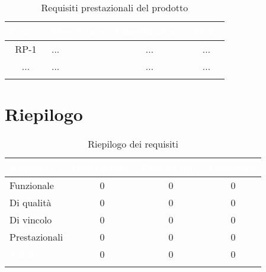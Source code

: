 \begingroup
\setlength{\tabcolsep}{10pt}
\renewcommand{\arraystretch}{1.5}
\begin{xltabular}{\textwidth}{| c | X | c | c |}
    \hline
     \textbf{\textcolor{white}{Codice}} & \textbf{\textcolor{white}{Descrizione}} & \textbf{\textcolor{white}{Classificazione}} & \textbf{\textcolor{white}{Fonte}}\\
    \hline
    \endhead
    RP-1 & ... & ... & ... \\
    \hline
    ... & ... & ... & ... \\
    \hline
     \caption{Requisiti prestazionali del prodotto}
    \label{tab:reqpre}
\end{xltabular}
\endgroup

\section{Riepilogo}
\begingroup
\setlength{\tabcolsep}{10pt}
\renewcommand{\arraystretch}{1.5}
\begin{xltabular}{\textwidth}{| X | c | c | c |}
    \hline
     \textbf{\textcolor{white}{Requisito}} & \textbf{\textcolor{white}{Obbligatorio}} & \textbf{\textcolor{white}{Desiderabile}} & \textbf{\textcolor{white}{Opzionale}}\\
    \hline
    \endhead
    Funzionale & 0 & 0 & 0 \\
    \hline
    Di qualità & 0 & 0 & 0 \\
    \hline
    Di vincolo & 0 & 0 & 0 \\
    \hline
    Prestazionali & 0 & 0 & 0 \\
    \hline
     \textbf{\textcolor{white}{Totale}} & 0 & 0 & 0 \\
    \hline
    
     \caption{Riepilogo dei requisiti}
    \label{tab:riepilogo}
\end{xltabular}
\endgroup

